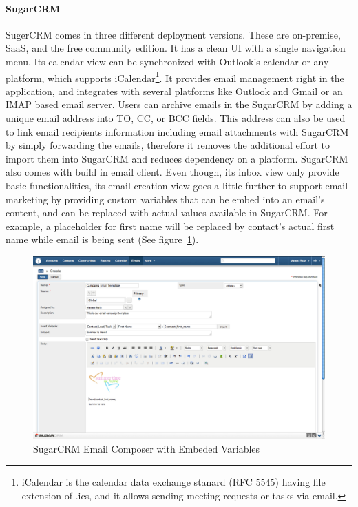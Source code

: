 \paragraph{SugarCRM}
SugerCRM comes in three different deployment versions. These are on-premise, \ac{SaaS}, and the free community edition. It has a clean \ac{UI} with a single navigation menu. Its calendar view can be synchronized with Outlook's calendar or any platform, which supports iCalendar\footnote{iCalendar is the calendar data exchange stanard (RFC 5545) having file extension of .ics, and it allows sending meeting requests or tasks via email.}. It provides email management right in the application, and integrates with several platforms like Outlook and Gmail or an \ac{IMAP} based email server. Users can archive emails in the SugarCRM by adding a unique email address into TO, \ac{CC}, or \ac{BCC} fields. This address can also be used to link email recipients information including email attachments with SugarCRM by simply forwarding the emails, therefore it removes the additional effort to import them into SugarCRM and reduces dependency on a platform. SugarCRM also comes with build in email client. Even though, its inbox view only provide basic functionalities, its email creation view goes a little further to support email marketing by providing custom variables that can be embed into an email's content, and can be replaced with actual values available in SugarCRM. For example, a placeholder for first name will be replaced by contact's actual first name while email is being sent (See figure~\ref{fig:SugarCRM-Create_Email}). 
\vspace{1cm}

\begin{figure}[htbp]
	\centering
	\includegraphics[width=1.00\textwidth]{imgs/SugarCRM-Create_Email.png}
	\caption[SugarCRM Email Composer with Embeded Variables]{SugarCRM Email Composer with Embeded Variables \citep{SugarCRMInc.2013}}
	\label{fig:SugarCRM-Create_Email}
\end{figure}

